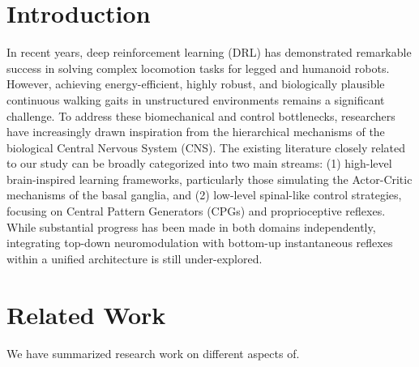 \documentclass[lettersize,journal]{IEEEtran}
\begin{document}
\section{Introduction}
In recent years, deep reinforcement learning (DRL) has demonstrated remarkable success in solving complex locomotion tasks for legged and humanoid robots. 
However, achieving energy-efficient, highly robust, and biologically plausible continuous walking gaits in unstructured environments remains a significant challenge. 
To address these biomechanical and control bottlenecks, researchers have increasingly drawn inspiration from the hierarchical mechanisms of the biological Central Nervous System (CNS). 
The existing literature closely related to our study can be broadly categorized into two main streams: (1) high-level brain-inspired learning frameworks, particularly those simulating the Actor-Critic mechanisms of the basal ganglia, and (2) low-level spinal-like control strategies, focusing on Central Pattern Generators (CPGs) and proprioceptive reflexes. 
While substantial progress has been made in both domains independently, integrating top-down neuromodulation with bottom-up instantaneous reflexes within a unified architecture is still under-explored. 
\begin{figure}[!t]
	\caption{}
	\label{fig:1}
\end{figure}

\section{Related Work}
We have summarized research work on different aspects of.
\end{document}
